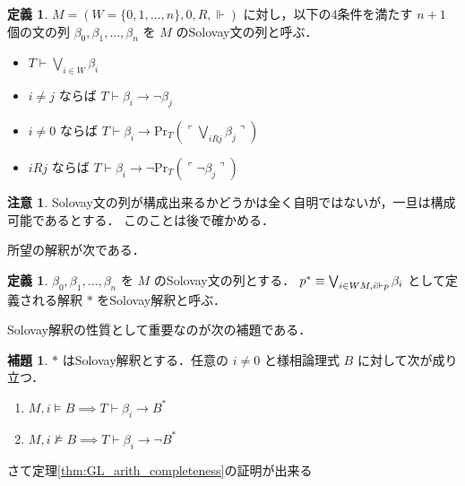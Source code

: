 \documentclass{jsarticle}
\newcommand*{\Provable}{\mathrm{Pr}}
\theoremstyle{definition}
\newtheorem{lemma}[theorem]{補題}
\newtheorem{definition}[theorem]{定義}
\newtheorem{remark}[theorem]{注意}
\begin{document}
\begin{definition}
    $M = (W = \{0,1,\dots,n\}, 0, R, \Vdash)$ に対し，以下の4条件を満たす $n + 1$ 個の文の列 $\beta_0, \beta_1, \dots, \beta_n$ を $M$ のSolovay文の列と呼ぶ．
    \begin{itemize}
        \item $T \vdash \bigvee_{i \in W} \beta_i$
        \item $i \neq j$ ならば $T \vdash \beta_i \to \lnot \beta_j$
        \item $i \neq 0$ ならば $T \vdash \beta_i \to \Provable_T(\ulcorner \bigvee_{i R j} \beta_j \urcorner)$
        \item $i R j$ ならば $T \vdash \beta_i \to \lnot \Provable_T(\ulcorner \lnot \beta_j \urcorner)$ 
    \end{itemize}
\end{definition}

\begin{remark}
    Solovay文の列が構成出来るかどうかは全く自明ではないが，一旦は構成可能であるとする．
    このことは後で確かめる．
\end{remark}

所望の解釈が次である．

\begin{definition}
    $\beta_0, \beta_1, \dots, \beta_n$ を $M$ のSolovay文の列とする．
    $p^* \equiv \bigvee_{i \in W \\ M, i \Vdash p} \beta_i$ として定義される解釈 $*$ をSolovay解釈と呼ぶ．
\end{definition}

Solovay解釈の性質として重要なのが次の補題である．

\begin{lemma}\label{lem:solovay_interpretation}
    $*$ はSolovay解釈とする．任意の $i \neq 0$ と様相論理式 $B$ に対して次が成り立つ．
    \begin{enumerate}
        \item $M, i \vDash B \implies T \vdash \beta_i \to B^*$
        \item $M, i \nvDash B \implies T \vdash \beta_i \to \lnot B^*$
    \end{enumerate}
\end{lemma}

さて定理\ref{thm:GL_arith_completeness}の証明が出来る
\end{document}

